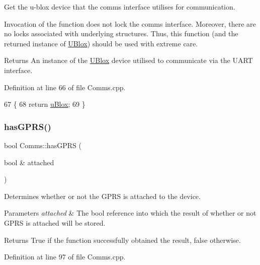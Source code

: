Get the u-\/blox device that the comms interface utilises for communication.

Invocation of the function does not lock the comms interface. Moreover, there are no locks associated with underlying structures. Thus, this function (and the returned instance of \hyperlink{class_u_blox}{U\+Blox}) should be used with extreme care.

\begin{DoxyReturn}{Returns}
An instance of the \hyperlink{class_u_blox}{U\+Blox} device utilised to communicate via the U\+A\+RT interface. 
\end{DoxyReturn}


Definition at line 66 of file Comms.\+cpp.


\begin{DoxyCode}
67 \{
68     \textcolor{keywordflow}{return} \hyperlink{class_comms_ac64dea134b116147e5441172346dbd6c}{uBlox};
69 \}
\end{DoxyCode}
\mbox{\label{class_comms_a583e3d933cca0c1eca9ec77e66bd6b84}} 
\subsubsection{\texorpdfstring{has\+G\+P\+R\+S()}{hasGPRS()}}
{\footnotesize\ttfamily bool Comms\+::has\+G\+P\+RS (\begin{DoxyParamCaption}\item[{bool \&}]{attached }\end{DoxyParamCaption})}

Determines whether or not the G\+P\+RS is attached to the device.


\begin{DoxyParams}{Parameters}
{\em attached} & The bool reference into which the result of whether or not G\+P\+RS is attached will be stored. \\
\hline
\end{DoxyParams}
\begin{DoxyReturn}{Returns}
True if the function successfully obtained the result, false otherwise. 
\end{DoxyReturn}


Definition at line 97 of file Comms.\+cpp.


